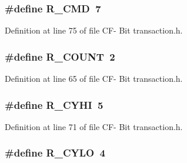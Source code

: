 \subsubsection[{R\+\_\+\+C\+M\+D}]{\setlength{\rightskip}{0pt plus 5cm}\#define R\+\_\+\+C\+M\+D~7}\label{_c_f-_01_bit_01transaction_8h_acc6fa55e6ee7e4b6adc5fdc8928b5dd9}


Definition at line 75 of file C\+F-\/ Bit transaction.\+h.

\hypertarget{_c_f-_01_bit_01transaction_8h_a0cb64f6ffafe32f3ef2b7a7b1051b591}{}
\subsubsection[{R\+\_\+\+C\+O\+U\+N\+T}]{\setlength{\rightskip}{0pt plus 5cm}\#define R\+\_\+\+C\+O\+U\+N\+T~2}\label{_c_f-_01_bit_01transaction_8h_a0cb64f6ffafe32f3ef2b7a7b1051b591}


Definition at line 65 of file C\+F-\/ Bit transaction.\+h.

\hypertarget{_c_f-_01_bit_01transaction_8h_ab81360234f216f08abe4f84bc2cd15bd}{}
\subsubsection[{R\+\_\+\+C\+Y\+H\+I}]{\setlength{\rightskip}{0pt plus 5cm}\#define R\+\_\+\+C\+Y\+H\+I~5}\label{_c_f-_01_bit_01transaction_8h_ab81360234f216f08abe4f84bc2cd15bd}


Definition at line 71 of file C\+F-\/ Bit transaction.\+h.

\hypertarget{_c_f-_01_bit_01transaction_8h_a970d3f9d433a03b1978c39ff42b70fa2}{}
\subsubsection[{R\+\_\+\+C\+Y\+L\+O}]{\setlength{\rightskip}{0pt plus 5cm}\#define R\+\_\+\+C\+Y\+L\+O~4}\label{_c_f-_01_bit_01transaction_8h_a970d3f9d433a03b1978c39ff42b70fa2}


